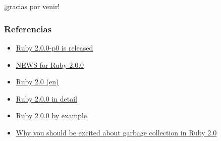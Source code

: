 \documentclass[compress]{beamer}
\begin{document}
\section{}

\begin{frame}{}
  \begin{center}
  {\Huge ¡gracias por venir!}
  \end{center}
\end{frame}

\begin{frame}[fragile]
\frametitle{Referencias}
  \begin{itemize}
  \item \href{http://goo.gl/WMq2a}{Ruby 2.0.0-p0 is released}
  \item \href{http://goo.gl/9E0Tk}{NEWS for Ruby 2.0.0}
  \item \href{http://goo.gl/IAAOF}{Ruby 2.0 (en)}
  \item \href{http://goo.gl/W6pGK}{Ruby 2.0.0 in detail}
  \item \href{http://goo.gl/oNC3m}{Ruby 2.0.0 by example}
  \item \href{http://goo.gl/fbsXD}{Why you should be excited about garbage collection in Ruby 2.0}
  \end{itemize}
\end{frame}
\end{document}
